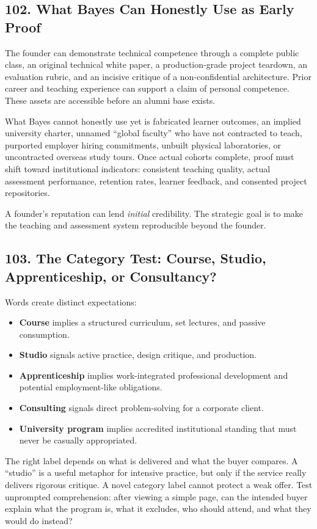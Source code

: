 \subsection*{102. What Bayes Can Honestly Use as Early Proof}

The founder can demonstrate technical competence through a complete public class, an original technical white paper, a production-grade project teardown, an evaluation rubric, and an incisive critique of a non-confidential architecture. Prior career and teaching experience can support a claim of personal competence. These assets are accessible before an alumni base exists.

What Bayes cannot honestly use yet is fabricated learner outcomes, an implied university charter, unnamed ``global faculty'' who have not contracted to teach, purported employer hiring commitments, unbuilt physical laboratories, or uncontracted overseas study tours. Once actual cohorts complete, proof must shift toward institutional indicators: consistent teaching quality, actual assessment performance, retention rates, learner feedback, and consented project repositories.

A founder's reputation can lend \emph{initial} credibility. The strategic goal is to make the teaching and assessment system reproducible beyond the founder.

\subsection*{103. The Category Test: Course, Studio, Apprenticeship, or Consultancy?}

Words create distinct expectations:
\begin{itemize}
    \item \textbf{Course} implies a structured curriculum, set lectures, and passive consumption.
    \item \textbf{Studio} signals active practice, design critique, and production.
    \item \textbf{Apprenticeship} implies work-integrated professional development and potential employment-like obligations.
    \item \textbf{Consulting} signals direct problem-solving for a corporate client.
    \item \textbf{University program} implies accredited institutional standing that must never be casually appropriated.
\end{itemize}

The right label depends on what is delivered and what the buyer compares. A ``studio'' is a useful metaphor for intensive practice, but only if the service really delivers rigorous critique. A novel category label cannot protect a weak offer. Test unprompted comprehension: after viewing a simple page, can the intended buyer explain what the program is, what it excludes, who should attend, and what they would do instead?

